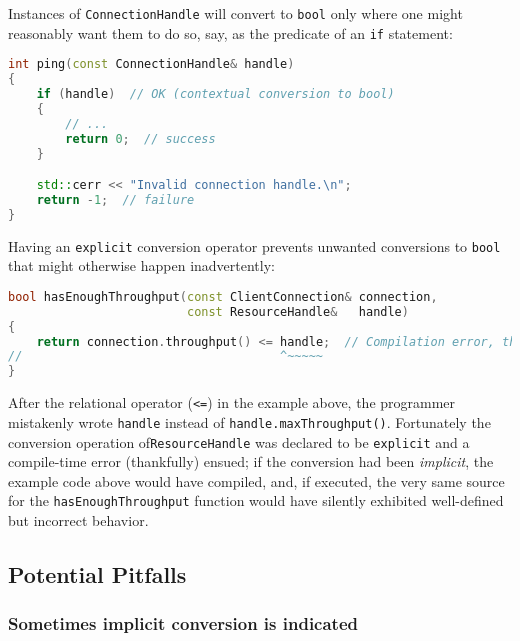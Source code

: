 \noindent Instances of \texttt{ConnectionHandle} will convert to \texttt{bool}
only where one might reasonably want them to do so, say, as the
predicate of an \texttt{if} statement:

\begin{lstlisting}[language=C++]
int ping(const ConnectionHandle& handle)
{
    if (handle)  // OK (contextual conversion to bool)
    {
        // ...
        return 0;  // success
    }

    std::cerr << "Invalid connection handle.\n";
    return -1;  // failure
}
\end{lstlisting}

\noindent Having an \texttt{explicit} conversion operator prevents unwanted
conversions to \texttt{bool} that might otherwise happen inadvertently:

\begin{lstlisting}[language=C++]
bool hasEnoughThroughput(const ClientConnection& connection,
                         const ResourceHandle&   handle)
{
    return connection.throughput() <= handle;  // Compilation error, thankfully
//                                    ^~~~~~
}
\end{lstlisting}

\noindent After the relational operator (\texttt{<=}) in the example above, the
programmer mistakenly wrote \texttt{handle} instead of
\mbox{\texttt{handle.maxThroughput()}}. Fortunately the conversion operation of\linebreak[4] %
\mbox{\texttt{ResourceHandle}} was declared to be \texttt{explicit} and a
compile-time error (thankfully) ensued; if the conversion had
been \emph{implicit}, the example code above would have compiled, and,
if executed, the very same source for the \mbox{\texttt{hasEnoughThroughput}}
function would have silently exhibited well-defined but incorrect
behavior.

\subsection[Potential Pitfalls]{Potential Pitfalls}\label{potential-pitfalls-explicitconv}

\subsubsection[Sometimes implicit conversion is indicated]{Sometimes implicit conversion is indicated}\label{sometimes-implicit-conversion-is-indicated}

